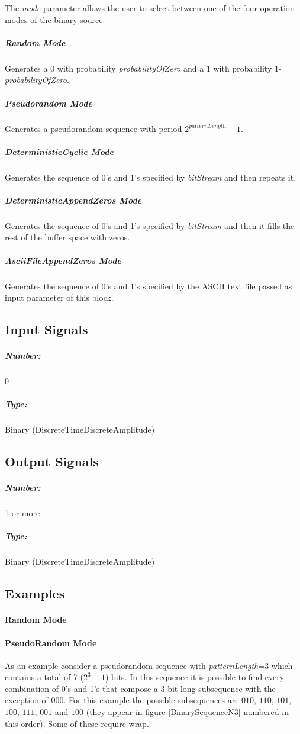 The \textit{mode} parameter allows the user to select between one of the four operation modes of the binary source.

\subparagraph*{Random Mode}
Generates a 0 with probability \textit{probabilityOfZero} and a 1 with probability 1-\textit{probabilityOfZero}.

\subparagraph*{Pseudorandom Mode}
Generates a pseudorandom sequence with period $2^\textit{patternLength}-1$.

\subparagraph*{DeterministicCyclic Mode}
Generates the sequence of 0's and 1's specified by \textit{bitStream} and then repeats it.

\subparagraph*{DeterministicAppendZeros Mode}
Generates the sequence of 0's and 1's specified by \textit{bitStream} and then it fills the rest of the buffer space with zeros.

\subparagraph*{AsciiFileAppendZeros Mode}
Generates the sequence of 0's and 1's specified by the ASCII text file passed as input parameter of this block.


\subsection*{Input Signals}


\subparagraph*{Number:} 0

\subparagraph*{Type:} Binary (DiscreteTimeDiscreteAmplitude)

\subsection*{Output Signals}

\subparagraph*{Number:} 1 or more

\subparagraph*{Type:} Binary (DiscreteTimeDiscreteAmplitude)

\subsection*{Examples}

\paragraph*{Random Mode}

\paragraph*{PseudoRandom Mode}
As an example consider a pseudorandom sequence with \textit{patternLength}=3 which contains a total of 7 ($2^3-1$) bits. In this sequence it is possible to find every combination of 0's and 1's that compose a 3 bit long subsequence with the exception of $000$. For this example the possible subsequences are $010$, $110$, $101$, $100$, $111$, $001$ and $100$ (they appear in figure \ref{BinarySequenceN3} numbered in this order). Some of these require wrap.

